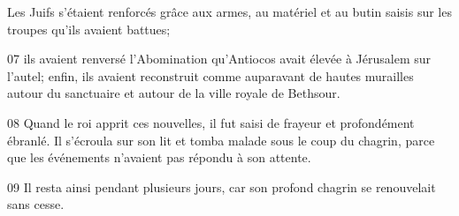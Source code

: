 Les Juifs s’étaient renforcés grâce aux armes, au matériel et au butin saisis sur les troupes qu’ils avaient battues;

07 ils avaient renversé l’Abomination qu’Antiocos avait élevée à Jérusalem sur l’autel; enfin, ils avaient reconstruit comme auparavant de hautes murailles autour du sanctuaire et autour de la ville royale de Bethsour.

08 Quand le roi apprit ces nouvelles, il fut saisi de frayeur et profondément ébranlé. Il s’écroula sur son lit et tomba malade sous le coup du chagrin, parce que les événements n’avaient pas répondu à son attente.

09 Il resta ainsi pendant plusieurs jours, car son profond chagrin se renouvelait sans cesse. 
